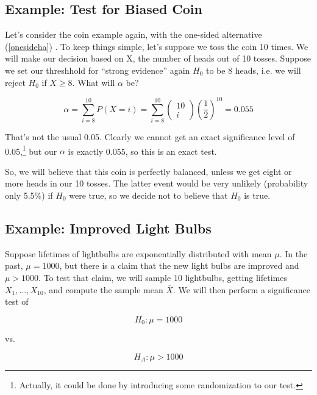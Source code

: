 \subsection{Example: Test for Biased Coin}

Let's consider the coin example again, with the one-sided alternative
(\ref{onesideha}) .  To keep things simple, let's suppose we toss the
coin 10 times.  We will make our decision based on X, the number of
heads out of 10 tosses.  Suppose we set our threshhold for ``strong
evidence'' again $H_0$ to be 8 heads, i.e. we will reject $H_0$ if $X
\geq 8$.  What will $\alpha$ be?

\begin{equation}
\alpha = \sum_{i=8}^{10} P(X = i) = 
\sum_{i=8}^{10} 
 \left (
\begin{array}{c}
10 \\
i
\end{array}
\right )
\left ( \frac{1}{2} \right )^{10} = 0.055
\end{equation}

That's not the usual 0.05.  Clearly we cannot get an exact significance
level of 0.05,\footnote{Actually, it could be done by introducing some
randomization to our test.} but our $\alpha$ is exactly 0.055, so this
is an exact test.

So, we will believe that this coin is perfectly balanced, unless we get
eight or more heads in our 10 tosses.  The latter event would be very
unlikely (probability only 5.5\%) if $H_0$ were true, so we decide not
to believe that $H_0$ is true.

\subsection{Example:  Improved Light Bulbs}
\label{bulbexact}

Suppose lifetimes of lightbulbs are exponentially distributed with mean
$\mu$. In the past, $\mu = 1000$, but there is a claim that the new
light bulbs are improved and $\mu > 1000$. To test that claim, we will
sample 10 lightbulbs, getting lifetimes $X_1,...,X_{10}$, and compute
the sample mean $\overline{X}$.  We will then perform a significance
test of 

\begin{equation}
H_0: \mu = 1000
\end{equation}

vs. 

\begin{equation}
H_A: \mu > 1000
\end{equation}

